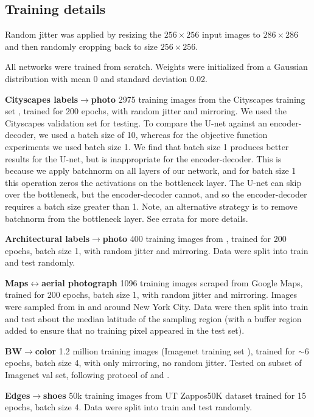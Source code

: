 \documentclass[10pt,twocolumn,letterpaper]{article}
\begin{document}
\subsection{Training details}

Random jitter was applied by resizing the $256 \times 256$ input images to $286 \times 286$ and then randomly cropping back to size $256 \times 256$.

All networks were trained from scratch. Weights were initialized from a Gaussian distribution with mean 0 and standard deviation 0.02.

{\bf Cityscapes labels$\rightarrow$photo} 2975 training images from the Cityscapes training set \cite{Cordts2016Cityscapes}, trained for 200 epochs, with random jitter and mirroring. We used the Cityscapes validation set for testing. To compare the U-net against an encoder-decoder, we used a batch size of 10, whereas for the objective function experiments we used batch size 1. We find that batch size 1 produces better results for the U-net, but is inappropriate for the encoder-decoder. This is because we apply batchnorm on all layers of our network, and for batch size 1 this operation zeros the activations on the bottleneck layer. The U-net can skip over the bottleneck, but the encoder-decoder cannot, and so the encoder-decoder requires a batch size greater than 1. Note, an alternative strategy is to remove batchnorm from the bottleneck layer. See errata for more details.

{\bf Architectural labels$\rightarrow$photo} 400 training images from \cite{Tylecek13}, trained for 200 epochs, batch size 1, with random jitter and mirroring. Data were split into train and test randomly.

{\bf Maps$\leftrightarrow$aerial photograph} 1096 training images scraped from Google Maps, trained for 200 epochs, batch size 1, with random jitter and mirroring. Images were sampled from in and around New York City. Data were then split into train and test about the median latitude of the sampling region (with a buffer region added to ensure that no training pixel appeared in the test set).

{\bf BW$\rightarrow$color} 1.2 million training images (Imagenet training set \cite{russakovsky2015imagenet}), trained for $\sim 6$ epochs, batch size 4, with only mirroring, no random jitter. Tested on subset of Imagenet val set, following protocol of \cite{zhang2016colorful} and \cite{larsson2016learning}.

{\bf Edges$\rightarrow$shoes} 50k training images from UT Zappos50K dataset \cite{yu2014fine} trained for 15 epochs, batch size 4.  Data were split into train and test randomly.
\end{document}
